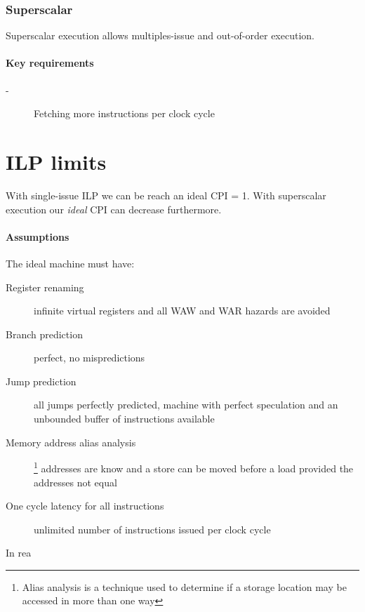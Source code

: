
\subsubsection{Superscalar}
Superscalar execution allows multiples-issue and out-of-order execution.

\paragraph{Key requirements}
\begin{description}
    \item[-] Fetching more instructions per clock cycle
\end{description}

\section{ILP limits}\label{sec:ilp-limits}
With single-issue ILP we can be reach an ideal CPI = 1.
With superscalar execution our \textit{ideal} CPI can decrease furthermore.

\paragraph{Assumptions} The ideal machine must have:
\begin{description}
    \item[Register renaming] infinite virtual registers and all WAW and WAR hazards are avoided
    \item[Branch prediction] perfect, no mispredictions
    \item[Jump prediction] all jumps perfectly predicted, machine with perfect speculation and an unbounded buffer of
    instructions available
    \item[Memory address alias analysis]\footnote{Alias analysis is a technique used to determine if a storage location may be accessed in more than one way} addresses are know and a store can be moved before a load provided the 
    addresses not equal 
    \item[One cycle latency for all instructions] unlimited number of instructions issued per clock cycle
\end{description}
In rea